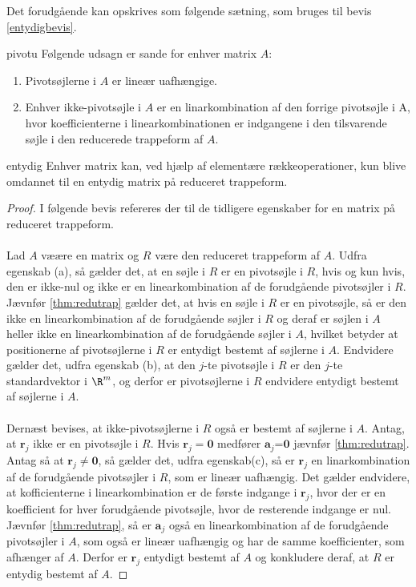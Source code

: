 Det forudgående kan opskrives som følgende sætning, som bruges til bevis \ref{entydigbevis}.

\begin{thm}{}{pivotu}
Følgende udsagn er sande for enhver matrix $A$: 
\begin{enumerate}[label=(\alph*)]
\item Pivotsøjlerne i $A$ er lineær uafhængige. 
\item Enhver ikke-pivotsøjle i $A$ er en linarkombination af den forrige pivotsøjle i A, hvor koefficienterne i linearkombinationen er indgangene i den tilsvarende søjle i den reducerede trappeform af $A$. 
\end{enumerate} 
\end{thm}

\begin{thm}{}{entydig}
Enhver matrix kan, ved hjælp af elementære rækkeoperationer, kun blive omdannet til en entydig matrix på reduceret trappeform.
\end{thm}
%
\begin{proof}\label{entydigbevis}
I følgende bevis refereres der til de tidligere egenskaber for en matrix på reduceret trappeform. \\\\
Lad $A$ væære en matrix og $R$ være den reduceret trappeform af $A$. 
Udfra egenskab (a), så gælder det, at en søjle i $R$ er en pivotsøjle i $R$, hvis og kun hvis, den er ikke-nul og ikke er en linearkombination af de forudgående pivotsøjler i $R$. 
Jævnfør \ref{thm:redutrap} gælder det, at hvis en søjle i $R$ er en pivotsøjle, så er den ikke en linearkombination af de forudgående søjler i $R$ og deraf er søjlen i $A$ heller ikke en linearkombination af de forudgående  søjler i $A$, hvilket betyder at positionerne af pivotsøjlerne i $R$ er entydigt bestemt af søjlerne i $A$. 
Endvidere gælder det, udfra egenskab (b), at den $j$-te pivotsøjle i $R$ er den $j$-te standardvektor i $\R^m$, og derfor er pivotsøjlerne i $R$ endvidere entydigt bestemt af søjlerne i $A$. \\\\
Dernæst bevises, at ikke-pivotsøjlerne i $R$ også er bestemt af søjlerne i $A$. 
Antag, at $\textbf{r}_j$ ikke er en pivotsøjle i $R$.
Hvis $\textbf{r}_j=\textbf{0}$ medfører $\textbf{a}_j$=$\textbf{0}$ jævnfør \ref{thm:redutrap}. 
Antag så at $\textbf{r}_j \neq \textbf{0}$, så gælder det, udfra egenskab(c), så er $\textbf{r}_j$ en linarkombination af de forudgående pivotsøjler i $R$, som er lineær uafhængig. 
Det gælder endvidere, at kofficienterne i linearkombination er de første indgange i $\textbf{r}_j$, hvor der er en koefficient for hver forudgående pivotsøjle, hvor de resterende indgange er nul. 
Jævnfør \ref{thm:redutrap}, så er $\textbf{a}_j$ også en linearkombination af de forudgående pivotsøjler i $A$, som også er lineær uafhængig og har de samme koefficienter, som afhænger af $A$. 
Derfor er $\textbf{r}_j$ entydigt bestemt af $A$ og konkludere deraf, at $R$ er entydig bestemt af $A$. 
\end{proof}
